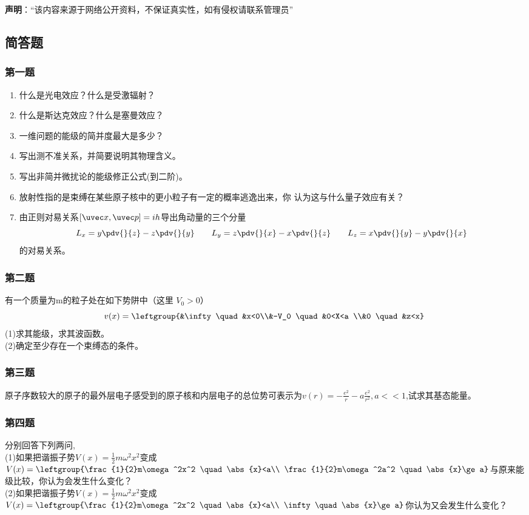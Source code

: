 

\textbf{声明}：“该内容来源于网络公开资料，不保证真实性，如有侵权请联系管理员”

\subsection{简答题}
\subsubsection{第一题}
\begin{enumerate}
\item 什么是光电效应？什么是受激辐射？
\item 什么是斯达克效应？什么是塞曼效应？
\item 一维问题的能级的简并度最大是多少？
\item 写出测不准关系，并简要说明其物理含义。
\item 写出非简并微扰论的能级修正公式(到二阶)。
\item 放射性指的是束缚在某些原子核中的更小粒子有一定的概率逃逸出来，你
认为这与什么量子效应有关？
\item 由正则对易关系$[\uvec x,\uvec p]=ih$导出角动量的三个分量
\begin{equation}
L_x=y\pdv{}{z}-z\pdv{}{y} \qquad L_y=z\pdv{}{x}-x\pdv{}{z} \qquad L_z=x\pdv{}{y}-y\pdv{}{x}~
\end{equation}
的对易关系。
\end{enumerate}
\subsubsection{第二题}
有一个质量为m的粒子处在如下势阱中（这里 $V_0>0$）
\begin{equation}
v(x)=\leftgroup{&\infty   \quad &x<0\\&-V_0 \quad &0<X<a \\&0 \quad &z<x}~
\end{equation}
(1)求其能级，求其波函数。\\
(2)确定至少存在一个束缚态的条件。
\subsubsection{第三题}
原子序数较大的原子的最外层电子感受到的原子核和内层电子的总位势可表示为$v(r)=-\frac{e^2}{r}-a\frac{e^2}{r^2},a<<1$,试求其基态能量。
\subsubsection{第四题}
分别回答下列两问,\\
(1)如果把谐振子势$V(x)=\frac{1}{2}m\omega^2x^2$变成$V(x)=\leftgroup{\frac{1}{2}m\omega^2x^2 \quad \abs{x}<a\\ \frac{1}{2}m\omega^2a^2 \quad \abs{x}\ge a}$与原来能级比较，你认为会发生什么变化？\\
(2)如果把谐振子势$V(x)=\frac{1}{2}m\omega^2x^2$变成$V(x)=\leftgroup{\frac{1}{2}m\omega^2x^2 \quad \abs{x}<a\\ \infty \quad \abs{x}\ge a}$你认为又会发生什么变化？

